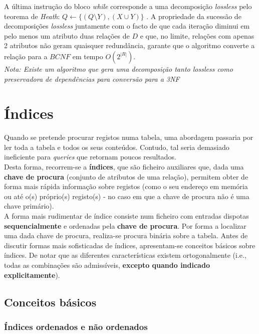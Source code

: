 \documentclass[oneside]{book}
\theoremstyle{definition}
\begin{document}
 A última instrução do bloco \textit{while} corresponde a uma decomposição \textit{lossless} pelo teorema de \textit{Heath}: $Q \gets \{(Q \setminus Y), (X \cup Y)\}$ . A propriedade da sucessão de decomposições \textit{lossless} juntamente com o facto de que cada iteração diminui em pelo menos um atributo duas relações de $D$ e que, no limite, relações com apenas 2 atributos não geram quaisquer redundância, garante que o algoritmo converte a relação para a $BCNF$ em tempo $O(2^{|R|})$. \\

\textit{Nota: Existe um algoritmo que gera uma decomposição tanto lossless como preservadora de dependências para conversão para a 3NF}



\chapter{Índices}

Quando se pretende procurar registos numa tabela, uma abordagem passaria por ler toda a tabela e todos os seus conteúdos. Contudo, tal seria demasiado ineficiente para \textit{queries} que retornam poucos resultados. \\
Desta forma, recorrem-se a \textbf{índices}, que são ficheiro auxiliares que, dada uma \textbf{chave de procura} (conjunto de atributos de uma relação), permitem obter de forma mais rápida informação sobre registos (como o seu endereço em memória ou até o(s) próprio(s) registo(s) - no caso em que a chave de procura não é uma chave primário).\\
A forma mais rudimentar de índice consiste num ficheiro com entradas dispotas \textbf{sequencialmente} e ordenadas pela \textbf{chave de procura}. Por forma a localizar uma dada chave de procura, realiza-se procura binária sobre a tabela. Antes de discutir formas mais sofisticadas de índices, apresentam-se conceitos básicos sobre índices. De notar que as diferentes características existem ortogonalmente (i.e., todas as combinações são admissíveis, \textbf{excepto quando indicado explicitamente}).

\section{Conceitos básicos}

\subsection{Índices ordenados e não ordenados}
 
\end{document}
